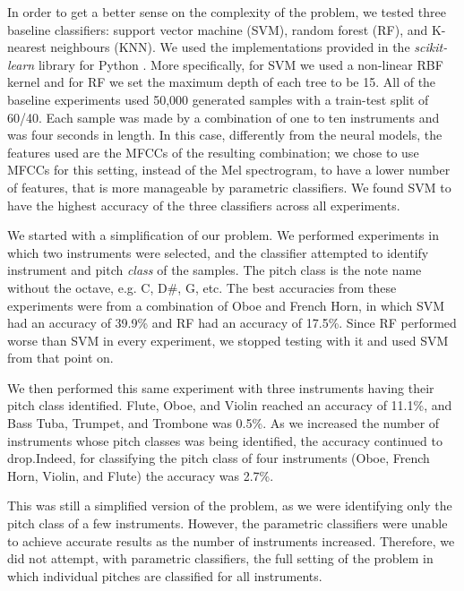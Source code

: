 \documentclass[runningheads,a4paper]{llncs}
\begin{document}
In order to get a better sense on the complexity of the problem, we tested three baseline classifiers: support vector machine (SVM), random forest (RF), and K-nearest neighbours (KNN). We used the implementations provided in the \emph{scikit-learn }library for Python \cite{scikit-learn}. More specifically, for SVM we used a non-linear RBF kernel and for RF we set the maximum depth of each tree to be 15.  All of the baseline experiments used 50,000 generated samples with a train-test split of 60/40. Each sample was made by a combination of one to ten instruments and was four seconds in length. 
In this case, differently from the neural models, the features used are the MFCCs of the resulting combination; we chose to use MFCCs for this setting, instead of the Mel spectrogram, to have a lower number of features, that is more manageable by parametric classifiers. We found SVM to have the highest accuracy of the three classifiers across all experiments.

We started with a simplification of our problem. We performed experiments in which two instruments were selected, and the classifier attempted to identify instrument and pitch \emph{class} of the samples. The pitch class is the note name without the octave, e.g. C, D\#, G, etc. The best accuracies from these experiments were from a combination of Oboe and French Horn, in which SVM had an accuracy of 39.9\% and RF had an accuracy of 17.5\%. Since RF performed worse than SVM in every experiment, we stopped testing with it and used SVM from that point on.

We then performed this same experiment with three instruments having their pitch class identified. Flute, Oboe, and Violin reached an accuracy of 11.1\%, and Bass Tuba, Trumpet, and Trombone was 0.5\%. As we increased the number of instruments whose pitch classes was being identified, the accuracy continued to drop.Indeed, for classifying the pitch class of four instruments (Oboe, French Horn, Violin, and Flute) the accuracy was 2.7\%.

This was still a simplified version of the problem, as we were identifying only the pitch class of a few instruments. However, the parametric classifiers were unable to achieve accurate results as the number of instruments increased. Therefore, we did not attempt, with parametric classifiers, the full setting of the problem in which individual pitches are classified for all instruments. 
\end{document}
